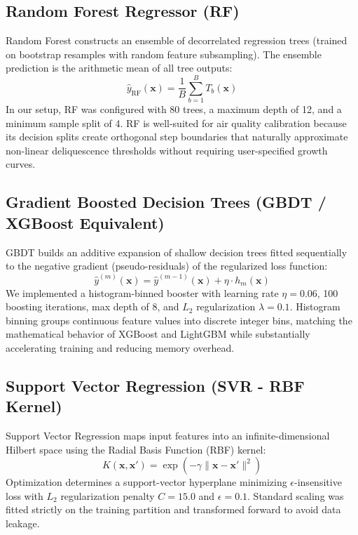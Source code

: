 \documentclass[11pt,a4paper]{article}
\begin{document}
\subsection{Random Forest Regressor (RF)}
Random Forest constructs an ensemble of decorrelated regression trees (trained on bootstrap resamples with random feature subsampling). The ensemble prediction is the arithmetic mean of all tree outputs:
\begin{equation}
    \hat{y}_{\text{RF}}(\mathbf{x}) = \frac{1}{B} \sum_{b=1}^{B} T_b(\mathbf{x})
\end{equation}
In our setup, RF was configured with 80 trees, a maximum depth of 12, and a minimum sample split of 4. RF is well-suited for air quality calibration because its decision splits create orthogonal step boundaries that naturally approximate non-linear deliquescence thresholds without requiring user-specified growth curves.

\subsection{Gradient Boosted Decision Trees (GBDT / XGBoost Equivalent)}
GBDT builds an additive expansion of shallow decision trees fitted sequentially to the negative gradient (pseudo-residuals) of the regularized loss function:
\begin{equation}
    \hat{y}^{(m)}(\mathbf{x}) = \hat{y}^{(m-1)}(\mathbf{x}) + \eta \cdot h_m(\mathbf{x})
\end{equation}
We implemented a histogram-binned booster with learning rate $\eta = 0.06$, 100 boosting iterations, max depth of 8, and $L_2$ regularization $\lambda = 0.1$. Histogram binning groups continuous feature values into discrete integer bins, matching the mathematical behavior of XGBoost and LightGBM while substantially accelerating training and reducing memory overhead.

\subsection{Support Vector Regression (SVR - RBF Kernel)}
Support Vector Regression maps input features into an infinite-dimensional Hilbert space using the Radial Basis Function (RBF) kernel:
\begin{equation}
    K(\mathbf{x}, \mathbf{x}') = \exp\left(-\gamma \|\mathbf{x} - \mathbf{x}'\|^2\right)
\end{equation}
Optimization determines a support-vector hyperplane minimizing $\epsilon$-insensitive loss with $L_2$ regularization penalty $C = 15.0$ and $\epsilon = 0.1$. Standard scaling was fitted strictly on the training partition and transformed forward to avoid data leakage.
\end{document}
